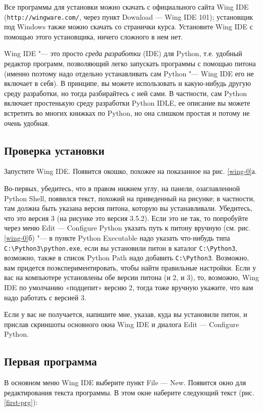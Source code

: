Все программы для установки можно скачать с официального сайта Wing IDE (\verb`http://wingware.com/`, 
через пункт Download --- Wing IDE 101); установщик под Windows также можно скачать со странички курса.
Установите Wing IDE с помощью этого установщика, ничего сложного в нем нет.

Wing IDE "--- это просто \textit{среда разработки} (IDE) для Python, т.е. удобный редактор программ,
позволяющий легко запускать программы с помощью питона (именно поэтому надо отдельно устанавливать сам 
Python "--- Wing IDE его не включает в себя). В принципе, вы можете использовать и какую-нибудь другую 
среду разработки, но тогда разбирайтесь с ней сами. В частности, сам Python включает простенькую среду 
разработки Python IDLE, ее описание вы можете встретить во многих  книжках по Python,
но она слишком простая и потому не очень удобная.

\subsection{Проверка установки}
Запустите Wing IDE. Появится окошко, похожее на показанное на рис. \ref{wing-0}а. 

Во-первых, убедитесь, что в правом нижнем углу, на панели, озаглавленной Python Shell, 
появился текст, похожий на приведенный на рисунке; в частности, там должна быть
указана версия питона, которую вы устанавливали. Убедитесь, что это версия 3 (на рисунке это версия 3.5.2).
Если это не так, то попробуйте через меню Edit --- Configure Python указать путь к питону вручную
(см. рис. \ref{wing-0}б) "--- в пункте Python Executable надо указать что-нибудь типа \verb`C:\Python3\python.exe`,
если вы установили питон в каталог \verb`C:\Python3`, возможно, также в список Python Path надо добавить 
\verb`C:\Python3`. Возможно, вам придется поэкспериментировать, чтобы найти правильные настройки. 
Если у вас на компьютере установлены обе версии питона (и 2, и 3), то, возможно, Wing IDE по умолчанию
«подцепит» версию 2, тогда тоже вручную укажите, что вам надо работать с версией 3.

Если у вас не получается, напишите мне, указав, куда вы установили питон, и прислав скриншоты основного окна
Wing IDE и диалога Edit — Configure Python.

\subsection{Первая программа}
В основном меню Wing IDE выберите пункт File --- New. Появится окно для редактирования текста программы. В этом окне наберите следующий текст (рис. \ref{first-prg}):


